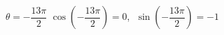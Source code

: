 {$\theta = -\dfrac{13\pi}{2}$}
{$\cos \left(-\dfrac{13\pi}{2}\right) = 0$, $\; \sin \left(-\dfrac{13\pi}{2}\right) = -1$ }
